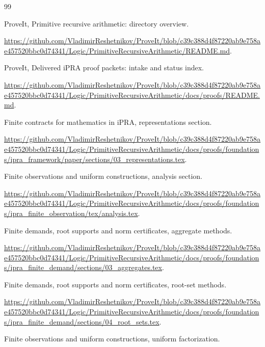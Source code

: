 \begin{thebibliography}{99}


ProveIt, Primitive recursive arithmetic: directory overview.

\url{https://github.com/VladimirReshetnikov/ProveIt/blob/c39c388d4f87220ab9e758ae457520bbc0d74341/Logic/PrimitiveRecursiveArithmetic/README.md}.


ProveIt, Delivered iPRA proof packets: intake and status index.

\url{https://github.com/VladimirReshetnikov/ProveIt/blob/c39c388d4f87220ab9e758ae457520bbc0d74341/Logic/PrimitiveRecursiveArithmetic/docs/proofs/README.md}.


Finite contracts for mathematics in iPRA, representations section.

\url{https://github.com/VladimirReshetnikov/ProveIt/blob/c39c388d4f87220ab9e758ae457520bbc0d74341/Logic/PrimitiveRecursiveArithmetic/docs/proofs/foundations/ipra_framework/paper/sections/03_representations.tex}.


Finite observations and uniform constructions, analysis section.

\url{https://github.com/VladimirReshetnikov/ProveIt/blob/c39c388d4f87220ab9e758ae457520bbc0d74341/Logic/PrimitiveRecursiveArithmetic/docs/proofs/foundations/ipra_finite_observation/tex/analysis.tex}.


Finite demands, root supports and norm certificates, aggregate methods.

\url{https://github.com/VladimirReshetnikov/ProveIt/blob/c39c388d4f87220ab9e758ae457520bbc0d74341/Logic/PrimitiveRecursiveArithmetic/docs/proofs/foundations/ipra_finite_demand/sections/03_aggregates.tex}.


Finite demands, root supports and norm certificates, root-set methods.

\url{https://github.com/VladimirReshetnikov/ProveIt/blob/c39c388d4f87220ab9e758ae457520bbc0d74341/Logic/PrimitiveRecursiveArithmetic/docs/proofs/foundations/ipra_finite_demand/sections/04_root_sets.tex}.


Finite observations and uniform constructions, uniform factorization.


\end{thebibliography}
